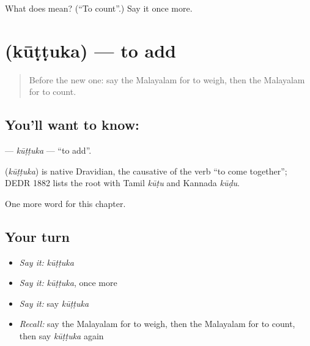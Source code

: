 \begin{tcolorbox}[breakable,colback=teal!4,colframe=teal!35!black,title={Before you move on}]
What does  mean? (\textquotedblleft{}To count\textquotedblright{}.) Say it once more.
\end{tcolorbox}
\section[\texorpdfstring{\ml{കൂട്ടുക} (kūṭṭuka)}{കൂട്ടുക (kūṭṭuka)}]{ (kūṭṭuka) — to add}

\label{lesson:ML-C303-kuttuka}



\begin{quote}
Before the new one: say the Malayalam for to weigh, then the Malayalam for to count.
\end{quote}

\subsection*{You'll want to know: }
\textbf{} — \emph{kūṭṭuka} — \textquotedblleft{}to add\textquotedblright{}.

\begin{cousinweb}
\textbf{} (\emph{kūṭṭuka}) is native Dravidian, the causative of the verb \textquotedblleft{}to come together\textquotedblright{}; DEDR 1882 lists the root with Tamil \emph{kūṭu} and Kannada \emph{kūḍu}.
\end{cousinweb}

\begin{grammarlens}[title={What you've built}]
One more word for this chapter.
\end{grammarlens}

\subsection*{Your turn}
\begin{itemize}
\raggedright
  \item \emph{Say it:} \emph{kūṭṭuka}
  \item \emph{Say it:} \emph{kūṭṭuka}, once more
  \item \emph{Say it:} say \emph{kūṭṭuka}
  \item \emph{Recall:} say the Malayalam for to weigh, then the Malayalam for to count, then say \emph{kūṭṭuka} again
\end{itemize}

